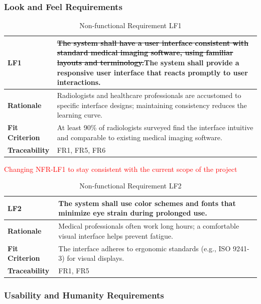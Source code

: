 \documentclass[12pt]{article}
\begin{document}
\subsubsection{Look and Feel Requirements}

\begin{table}[h!]
\centering
{}
\begin{tabular}{|p{3.5cm}|p{11.5cm}|}
\hline
\rowcolor{gray!30}
\textbf{LF1} & \sout{The system shall have a user interface consistent with standard medical imaging software, using familiar layouts and terminology.}The system shall provide a responsive user interface that reacts promptly to user interactions. \\
\hline
\textbf{Rationale} & Radiologists and healthcare professionals are accustomed to specific interface designs; maintaining consistency reduces the learning curve. \\
\hline
\textbf{Fit Criterion} & At least 90\% of radiologists surveyed find the interface intuitive and comparable to existing medical imaging software. \\
\hline
\textbf{Traceability} & FR1, FR5, FR6 \\
\hline
\end{tabular}
\caption{Non-functional Requirement LF1}
\textcolor{red}{Changing NFR-LF1 to stay consistent with the current scope of the project}
\end{table}

\begin{table}[h!]
\centering
{}
\begin{tabular}{|p{3.5cm}|p{11.5cm}|}
\hline
\rowcolor{gray!30}
\textbf{LF2} & The system shall use color schemes and fonts that minimize eye strain during prolonged use. \\
\hline
\textbf{Rationale} & Medical professionals often work long hours; a comfortable visual interface helps prevent fatigue. \\
\hline
\textbf{Fit Criterion} & The interface adheres to ergonomic standards (e.g., ISO 9241-3) for visual displays. \\
\hline
\textbf{Traceability} & FR1, FR5 \\
\hline
\end{tabular}
\caption{Non-functional Requirement LF2}
\end{table}
\newpage
\subsubsection{Usability and Humanity Requirements}
\end{document}

